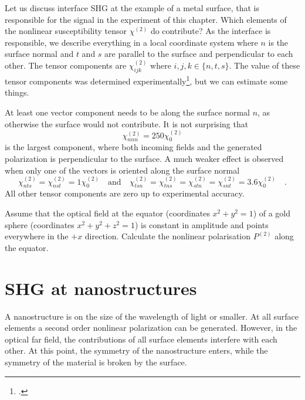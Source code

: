 Let us discuss interface SHG at the example of a metal surface, that is responsible for the signal in the experiment of this chapter. Which elements of the nonlinear susceptibility tensor $\chi^{(2)}$  do contribute? As the interface is responsible, we describe everything in a local coordinate system where $n$ is the surface normal and $t$  and $s$ are parallel to the surface and perpendicular to each other. The tensor components are $\chi^{(2)}_{ijk}$ where $  i,j,k  \in \{n , t, s \}$. The  value of these tensor components was determined experimentally\footcite{Makitalo11_OE,Wang09_prb}, but we can estimate some things.

At least one vector component needs to be along the surface normal $n$, as otherwise the surface would not contribute. It is not surprising that 
\begin{equation}
\chi^{(2)}_{nnn} = 250 \chi^{(2)}_0
\end{equation}
 is the largest component, where both incoming fields and the generated polarization is perpendicular to the surface. A much weaker effect is observed when only one of the vectors is oriented along the surface normal 
\begin{equation}
\chi^{(2)}_{nts} = \chi^{(2)}_{nst} = 1 \chi^{(2)}_0 \quad \text{and} \quad
\chi^{(2)}_{tsn} = \chi^{(2)}_{tns} = \chi^{(2)}_{stn} = \chi^{(2)}_{snt}= 3.6 \chi^{(2)}_0 \quad.
\end{equation}
All other tensor components are zero up to experimental accuracy.


\begin{questions}
\item Assume that the optical field at the equator  (coordinates $x^2 + y^2 = 1$)  of a gold sphere (coordinates $x^2 + y^2 + z^2 = 1$) is constant in amplitude and points everywhere in the $+x$ direction. Calculate the nonlinear polarisation $P^{(2)}$ along the equator. 

\end{questions}


\section{SHG at nanostructures}

A nanostructure is on the size of the wavelength of light or smaller. At all surface elements a second order nonlinear polarization can be generated. However, in the optical far field, the contributions of all surface elements interfere with each other. At this point, the symmetry of the nanostructure enters, while the symmetry of the material is broken by the surface.

